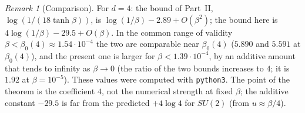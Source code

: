 \documentclass[11pt,a4paper]{article}
\theoremstyle{definition}
\theoremstyle{remark}
\newtheorem{remark}[theorem]{Remark}
\begin{document}
\begin{remark}[Comparison]\label{mg:rem:comparison}
For $d=4$: the bound of Part~II, $\log(1/(18\tanh\beta))$, is $\log(1/\beta)-2.89+O(\beta^2)$; the bound here is
$4\log(1/\beta)-29.5+O(\beta)$. In the common range of validity $\beta<\beta_0(4)\approx1.54\cdot10^{-4}$ the two are
comparable near $\beta_0(4)$ ($5.890$ and $5.591$ at $\beta_0(4)$), and the present one is larger for
$\beta<1.39\cdot10^{-4}$, by an additive amount that tends to infinity as $\beta\to0$ (the ratio of the two bounds increases
to $4$; it is $1.92$ at $\beta=10^{-5}$). These values were computed with \texttt{python3}. The point of the theorem is the
coefficient $4$, not the numerical strength at fixed $\beta$; the additive constant $-29.5$ is far from the predicted
$+4\log4$ for $SU(2)$ (from $u\approx\beta/4$).
\end{remark}
\end{document}
